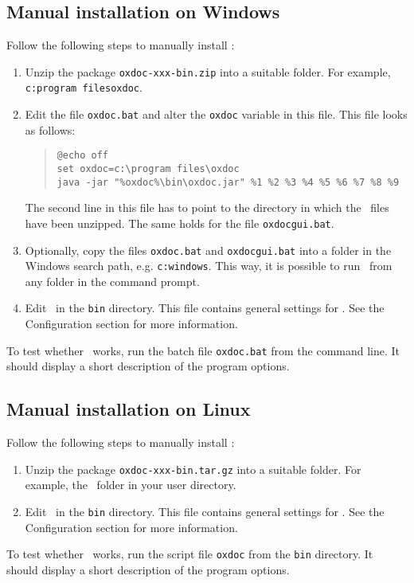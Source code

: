 \subsection{Manual installation on Windows}
Follow the following steps to manually install \oxdoc:
\begin{enumerate}
\item Unzip the package {\tt oxdoc-xxx-bin.zip} into a
suitable folder. For example, {\tt c:\bs program files\bs oxdoc}.
\item Edit the file
{\tt oxdoc.bat} and alter the {\tt oxdoc} variable in this file. This file looks
as follows:

\begin{quote}
\small \begin{verbatim}
@echo off
set oxdoc=c:\program files\oxdoc
java -jar "%oxdoc%\bin\oxdoc.jar" %1 %2 %3 %4 %5 %6 %7 %8 %9
\end{verbatim}
\end{quote}

The second line in this file has to point to the directory in which the \oxdoc~files
have been unzipped. The same holds for the file {\tt oxdocgui.bat}. 

\item Optionally, copy the files {\tt oxdoc.bat} and {\tt oxdocgui.bat} into a
folder in the Windows search path, e.g. {\tt c:\bs windows}. This way, it is possible to
run \oxdoc~from any folder in the command prompt. 

\item Edit \oxdocxml~in the {\tt bin} directory. This file contains general settings for \oxdoc.
See the Configuration section for more information.
\end{enumerate}

To test whether \oxdoc~works, run the batch file {\tt oxdoc.bat} from the command line.  It should 
display a short description of the program options.

\subsection{Manual installation on Linux}
Follow the following steps to manually install \oxdoc:
\begin{enumerate}
\item Unzip the package {\tt oxdoc-xxx-bin.tar.gz} into a
suitable folder. For example, the \oxdoc~folder in your user directory.

\item Edit \oxdocxml~in the {\tt bin} directory. This file contains general settings for \oxdoc.
See the Configuration section for more information.
\end{enumerate}

To test whether \oxdoc~works, run the script file {\tt oxdoc} from the {\tt bin} directory.  It should 
display a short description of the program options.

